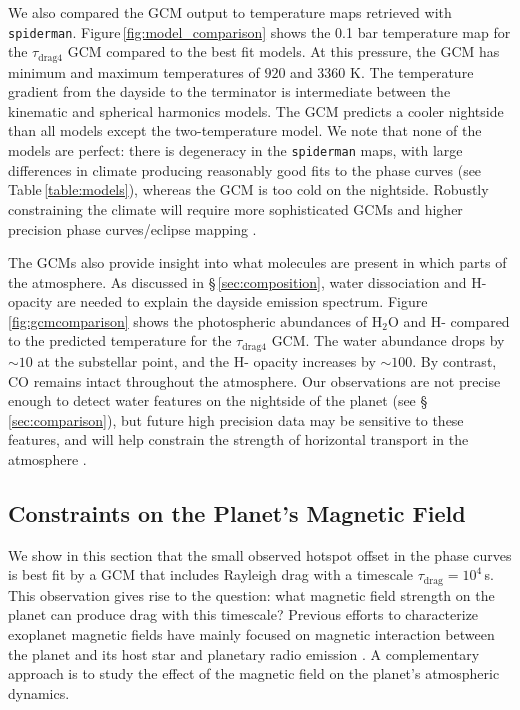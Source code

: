 \documentclass[twocolumn, trackchanges]{aastex61}
\begin{document}
We also compared the GCM output to temperature maps retrieved with \texttt{spiderman}. Figure\,\ref{fig:model_comparison} shows the 0.1 bar temperature map for the $\tau_\mathrm{drag4}$ GCM compared to the best fit models. At this pressure, the GCM has minimum and maximum temperatures of $920$ and $3360$ K. The temperature gradient from the dayside to the terminator is intermediate between the kinematic and spherical harmonics models. The GCM predicts a cooler nightside than all models except the two-temperature model.  We note that none of the models are perfect: there is degeneracy in the \texttt{spiderman} maps, with large differences in climate producing reasonably good fits to the phase curves (see Table\,\ref{table:models}), whereas the GCM is too cold on the nightside.  Robustly constraining the climate will require more sophisticated GCMs and higher precision phase curves/eclipse mapping \citep[e.g.][]{dewit12}.

The GCMs also provide insight into what molecules are present in which parts of the atmosphere. As discussed in \S\,\ref{sec:composition}, water dissociation and H- opacity are needed to explain the dayside emission spectrum. Figure\,\ref{fig:gcmcomparison} shows the photospheric abundances of H$_2$O and H- compared to the predicted temperature for the $\tau_\mathrm{drag4}$ GCM. The water abundance drops by $\sim10$ at the substellar point, and the H- opacity increases by $\sim100$.  By contrast, CO remains intact throughout the atmosphere.  Our observations are not precise enough to detect water features on the nightside of the planet (see \S\,\ref{sec:comparison}), but future high precision data may be sensitive to these features, and will help constrain the strength of horizontal transport in the atmosphere \citep{agundez14}.

\subsection{Constraints on the Planet's Magnetic Field}
We show in this section that the small observed hotspot offset in the phase curves is best fit by a GCM that includes Rayleigh drag with a timescale $\tau_\mathrm{drag} = 10^4$\,s. This observation gives rise to the question: what magnetic field strength on the planet can produce drag with this timescale?  Previous efforts to characterize exoplanet magnetic fields have mainly focused on magnetic interaction between the planet and its host star \citep[e.g.][and references therein]{wright15} and planetary radio emission \citep{griessmeier15}.  A complementary approach is to study the effect of the magnetic field on the planet's atmospheric dynamics.
\end{document}

